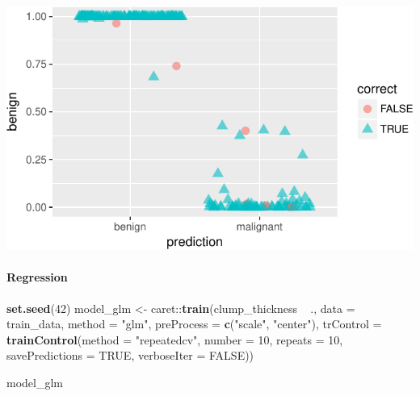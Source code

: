 \documentclass[]{article}
\newenvironment{Shaded}{\begin{snugshade}}{\end{snugshade}}
\newcommand{\KeywordTok}[1]{\textcolor[rgb]{0.13,0.29,0.53}{\textbf{{#1}}}}
\newcommand{\DataTypeTok}[1]{\textcolor[rgb]{0.13,0.29,0.53}{{#1}}}
\newcommand{\DecValTok}[1]{\textcolor[rgb]{0.00,0.00,0.81}{{#1}}}
\newcommand{\StringTok}[1]{\textcolor[rgb]{0.31,0.60,0.02}{{#1}}}
\newcommand{\OtherTok}[1]{\textcolor[rgb]{0.56,0.35,0.01}{{#1}}}
\newcommand{\NormalTok}[1]{{#1}}
\let\oldparagraph\paragraph
\renewcommand{\paragraph}[1]{\oldparagraph{#1}\mbox{}}
\begin{document}
\includegraphics{webinar_code_files/figure-latex/results_jitter_xgb-1.pdf}

\paragraph{Regression}\label{regression}

\begin{Shaded}
\begin{Highlighting}[]
\KeywordTok{set.seed}\NormalTok{(}\DecValTok{42}\NormalTok{)}
\NormalTok{model_glm <-}\StringTok{ }\NormalTok{caret::}\KeywordTok{train}\NormalTok{(clump_thickness ~}\StringTok{ }\NormalTok{.,}
                          \DataTypeTok{data =} \NormalTok{train_data,}
                          \DataTypeTok{method =} \StringTok{"glm"}\NormalTok{,}
                          \DataTypeTok{preProcess =} \KeywordTok{c}\NormalTok{(}\StringTok{"scale"}\NormalTok{, }\StringTok{"center"}\NormalTok{),}
                          \DataTypeTok{trControl =} \KeywordTok{trainControl}\NormalTok{(}\DataTypeTok{method =} \StringTok{"repeatedcv"}\NormalTok{, }
                                                  \DataTypeTok{number =} \DecValTok{10}\NormalTok{, }
                                                  \DataTypeTok{repeats =} \DecValTok{10}\NormalTok{, }
                                                  \DataTypeTok{savePredictions =} \OtherTok{TRUE}\NormalTok{, }
                                                  \DataTypeTok{verboseIter =} \OtherTok{FALSE}\NormalTok{))}
\end{Highlighting}
\end{Shaded}

\begin{Shaded}
\begin{Highlighting}[]
\NormalTok{model_glm}
\end{Highlighting}
\end{Shaded}
\end{document}
